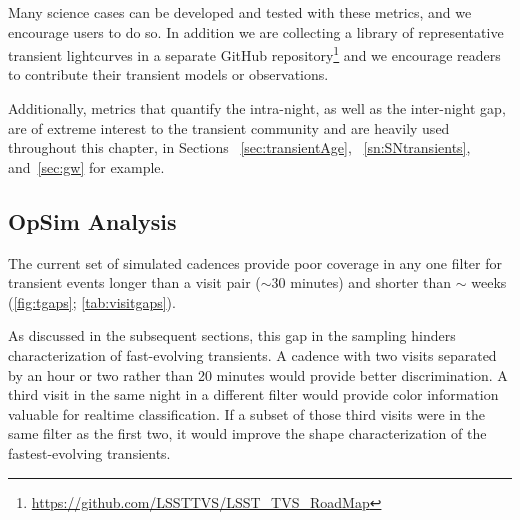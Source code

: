 Many science cases can be developed and tested with these metrics, and we encourage users to do so. In addition we are collecting a library of representative transient lightcurves in a separate GitHub repository\footnote{\url{https://github.com/LSSTTVS/LSST_TVS_RoadMap}} and we encourage readers to contribute their transient models or observations.

Additionally, metrics that quantify the intra-night, as well as the inter-night gap, are of extreme interest to the transient community and are heavily used throughout this chapter, in Sections ~\ref{sec:transientAge}, ~\ref{sn:SNtransients}, and~\ref{sec:gw} for example.



\subsection{OpSim Analysis}
\label{sec:\chpname:analysis}

The current set of simulated cadences
provide poor coverage in any one
filter for transient events longer than a visit pair ($\sim$30
minutes) and shorter than $\sim$ weeks (\autoref{fig:tgaps};
\autoref{tab:visitgaps}).

As discussed in the subsequent sections, this
gap in the sampling hinders characterization of fast-evolving
transients.  A cadence with two visits separated by an hour or two rather
than 20 minutes would provide better discrimination.  A third visit in the
same night in a different filter would provide
color information valuable for realtime classification.
If a subset of those third
visits were in the same filter as the first two, it would improve the shape
characterization of the fastest-evolving transients.


